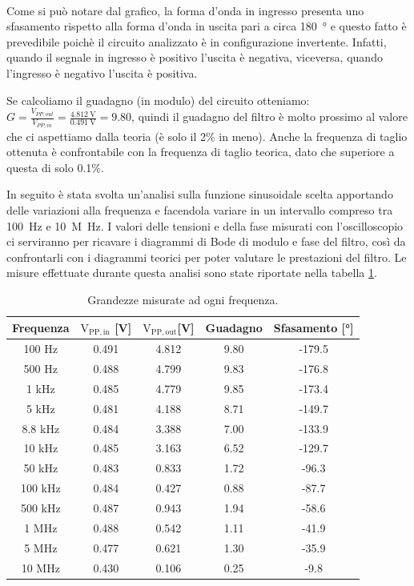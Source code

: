 \documentclass{report}
\begin{document}
\\Come si può notare dal grafico, la forma d'onda in ingresso presenta uno sfasamento rispetto alla forma d'onda in uscita pari a circa \SI{180}{\degree} e questo fatto è prevedibile poichè il circuito analizzato è in configurazione invertente. Infatti, quando il segnale in ingresso è positivo l'uscita è negativa, viceversa, quando l'ingresso è negativo l'uscita è positiva.\par %
Se calcoliamo il guadagno (in modulo) del circuito otteniamo: $\displaystyle{G=\frac{V_{PP,out}}{V_{PP,in}}=\frac{\SI{4.812}{\volt}}{\SI{0.491}{\volt}}=9.80}$, quindi il guadagno del filtro è molto prossimo al valore che ci aspettiamo dalla teoria (è solo il 2\% in meno). Anche la frequenza di taglio ottenuta è confrontabile con la frequenza di taglio teorica, dato che superiore a questa di solo 0.1\%.\par %
In seguito è stata svolta un'analisi sulla funzione sinusoidale scelta apportando delle variazioni alla frequenza e facendola variare in un intervallo compreso tra \SI{100}{\hertz} e \SI{10}{M\hertz}. I valori delle tensioni e della fase misurati con l'oscilloscopio ci serviranno per ricavare i diagrammi di Bode di modulo e fase del filtro, così da confrontarli con i diagrammi teorici per poter valutare le prestazioni del filtro. Le misure effettuate durante questa analisi sono state riportate nella tabella \ref{table:misure}. %
\begin{table}[h!]
	\centering
	\begin{tabular}{|c|c|c|c|c|}
		\hline
		\textbf{Frequenza} &\boldmath$\displaystyle\mathrm{{V_{PP,in}}}$ \textbf{[V]} & \boldmath$\displaystyle\mathrm{{V_{PP,out}}}$\textbf{[V]} & \textbf{Guadagno} & \textbf{Sfasamento [°]}\\
		\hline
		100 Hz & 0.491 & 4.812 & 9.80 & -179.5\\
		\hline
		500 Hz & 0.488 & 4.799 & 9.83 & -176.8\\
		\hline
		1 kHz & 0.485 & 4.779 & 9.85 & -173.4\\
		\hline
		5 kHz & 0.481 & 4.188 & 8.71 & -149.7\\
		\hline
		8.8 kHz & 0.484 & 3.388 & 7.00 & -133.9\\
		\hline
		10 kHz & 0.485 & 3.163 & 6.52 & -129.7\\
		\hline
		50 kHz & 0.483 & 0.833 & 1.72 & -96.3\\
		\hline
		100 kHz & 0.484 & 0.427 & 0.88 & -87.7\\
		\hline
		500 kHz & 0.487 & 0.943 & 1.94 & -58.6\\
		\hline
		1 MHz & 0.488 & 0.542 & 1.11 & -41.9\\
		\hline
		5 MHz & 0.477 & 0.621 & 1.30 & -35.9\\
		\hline
		10 MHz & 0.430 & 0.106 & 0.25 & -9.8\\
		\hline\end{tabular}
\caption{Grandezze misurate ad ogni frequenza.}
\label{table:misure}
\end{table}
\end{document}
